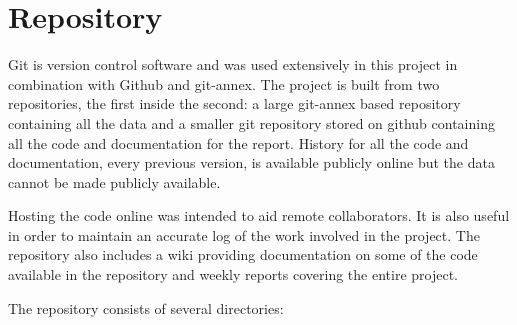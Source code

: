 \section{Repository}
\label{app:repository}

Git is version control software and was used extensively in this project in combination with Github\autocite{github} and git-annex\autocite{gitannex}.
The project is built from two repositories, the first inside the second: a large git-annex based repository containing all the data and a smaller git repository stored on github containing all the code and documentation for the report\autocite{opencast-bio}.
History for all the code and documentation, every previous version, is available publicly online but the data cannot be made publicly available.

Hosting the code online was intended to aid remote collaborators.
It is also useful in order to maintain an accurate log of the work involved in the project.
The repository also includes a wiki\autocite{opencastbiowiki} providing documentation on some of the code available in the repository and weekly reports covering the entire project.

The repository consists of several directories:

